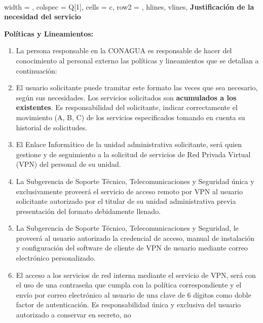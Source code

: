 \documentclass[letterpaper,11pt]{article}
\begin{document}
~ \\
\begin{tblr}[
	label = none,
	entry = none,
	]{
		width = \linewidth,
		colspec = {Q[1]},
		cells = {c},
		row{2} = {},
		hlines,
		vlines,
	}
	\textbf{Justificación de la necesidad del servicio} \\\JUSTIFICACION
\end{tblr}
\clearpage
\textbf{ \large Políticas y Lineamientos:}
{  \footnotesize\begin{enumerate}
	\item La persona responsable en la CONAGUA es responsable de hacer del 
              conocimiento al personal externo las políticas y lineamientos que se detallan a continuación:
	\item El usuario solicitante puede tramitar este formato las veces que sea 
              necesario, según sus necesidades. Los servicios solicitados son \textbf {acumulados 
              a los existentes}. Es responsabilidad del solicitante, indicar correctamente 
              el movimiento (A, B, C) de los servicios especificados tomando en cuenta su 
              historial de solicitudes.
	\item El Enlace Informático de la unidad administrativa solicitante, será quien 
              gestione y de seguimiento a la solicitud de servicios de Red Privada Virtual 
              (VPN) del personal de su unidad.
	\item La Subgerencia de Soporte Técnico, Telecomunicaciones y Seguridad única y 
              exclusivamente proveerá el servicio de acceso remoto por VPN al usuario solicitante 
              autorizado por el titular de su unidad administrativa previa presentación del formato 
              debidamente llenado.
	\item La Subgerencia de Soporte Técnico, Telecomunicaciones y Seguridad, le proveerá al 
              usuario autorizado la credencial de acceso, manual de instalación y configuración del 
              software de cliente de VPN de usuario mediante correo electrónico personalizado.
	\item El acceso a los servicios de red interna mediante el servicio de VPN, será con el 
              uso de una contraseña que cumpla con la política correspondiente y el envío por correo 
              electrónico al usuario de una clave de 6 dígitos como doble factor de autenticación. 
              Es responsabilidad única y exclusiva del usuario autorizado a conservar en secreto, no 

\end{enumerate}}
\end{document}

